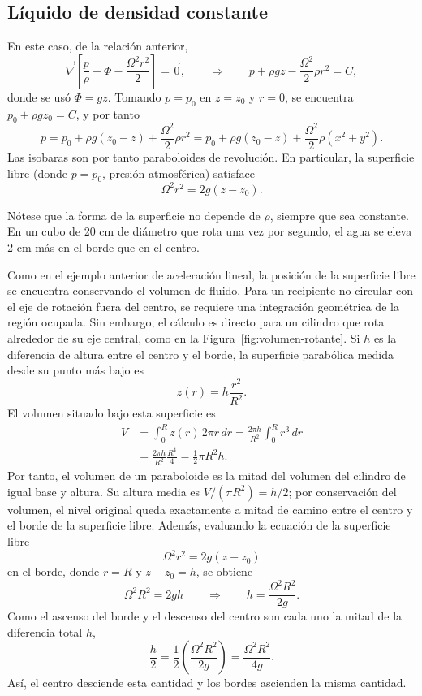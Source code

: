 \subsection{Líquido de densidad constante}

En este caso, de la relación anterior,
$$ \vec{\nabla}\left[\frac{p}{\rho} + \Phi - \frac{\Omega^2 r^2}{2}\right] = \vec{0}, \qquad\Rightarrow\qquad p + \rho gz - \frac{\Omega^2}{2}\rho r^2 = C, $$
donde se usó $\Phi = gz$. Tomando $p = p_0$ en $z = z_0$ y $r = 0$, se encuentra $p_0 + \rho g z_0 = C$, y por tanto
$$ p = p_0 + \rho g(z_0 - z) + \frac{\Omega^2}{2}\rho r^2 = p_0 + \rho g(z_0 - z) + \frac{\Omega^2}{2}\rho(x^2 + y^2). $$
Las isobaras son por tanto paraboloides de revolución. En particular, la superficie libre (donde $p = p_0$, presión atmosférica) satisface
$$ \Omega^2 r^2 = 2g(z - z_0). $$

Nótese que la forma de la superficie no depende de $\rho$, siempre que sea constante. En un cubo de 20 cm de diámetro que rota una vez por segundo, el agua se eleva 2 cm más en el borde que en el centro.

Como en el ejemplo anterior de aceleración lineal, la posición de la superficie libre se encuentra conservando el volumen de fluido. Para un recipiente no circular con el eje de rotación fuera del centro, se requiere una integración geométrica de la región ocupada. Sin embargo, el cálculo es directo para un cilindro que rota alrededor de su eje central, como en la Figura~\ref{fig:volumen-rotante}. Si $h$ es la diferencia de altura entre el centro y el borde, la superficie parabólica medida desde su punto más bajo es
$$
z(r)=h\frac{r^2}{R^2}.
$$
El volumen situado bajo esta superficie es
$$
\begin{aligned}
V
&=\int_0^R z(r)\,2\pi r\,dr
=\frac{2\pi h}{R^2}\int_0^R r^3\,dr\\
&=\frac{2\pi h}{R^2}\frac{R^4}{4}
=\frac{1}{2}\pi R^2h.
\end{aligned}
$$
Por tanto, el volumen de un paraboloide es la mitad del volumen del cilindro de igual base y altura. Su altura media es $V/(\pi R^2)=h/2$; por conservación del volumen, el nivel original queda exactamente a mitad de camino entre el centro y el borde de la superficie libre. Además, evaluando la ecuación de la superficie libre
$$
\Omega^2r^2=2g(z-z_0)
$$
en el borde, donde $r=R$ y $z-z_0=h$, se obtiene
$$
\Omega^2R^2=2gh
\qquad\Longrightarrow\qquad
h=\frac{\Omega^2R^2}{2g}.
$$
Como el ascenso del borde y el descenso del centro son cada uno la mitad de la diferencia total $h$,
$$
\frac{h}{2}
=\frac{1}{2}\left(\frac{\Omega^2R^2}{2g}\right)
=\frac{\Omega^2R^2}{4g}.
$$
Así, el centro desciende esta cantidad y los bordes ascienden la misma cantidad.

